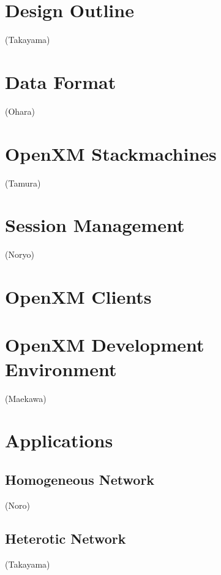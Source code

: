 \documentclass[submit]{acmconf}
\begin{document}
\section{Design Outline} (Takayama)


\section{Data Format} (Ohara)


\section{OpenXM Stackmachines}   (Tamura)


\section{Session Management}  (Noryo)


\section{OpenXM Clients}    


\section{OpenXM Development Environment}  (Maekawa)


\section{Applications}
\subsection{Homogeneous Network}  (Noro)

\subsection{Heterotic Network}   (Takayama)

\end{document}
